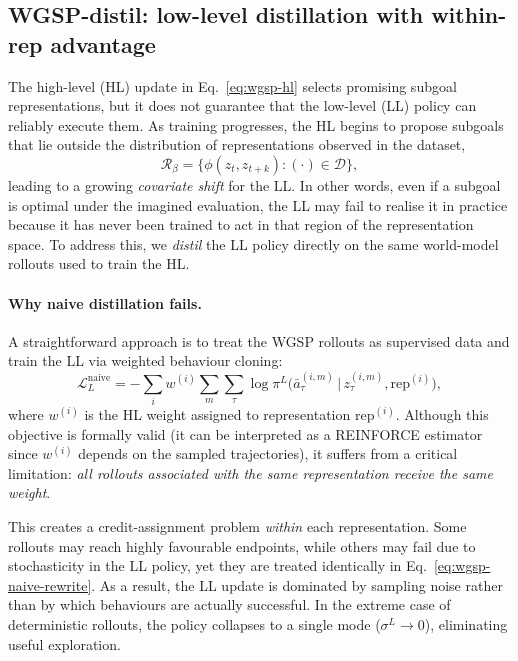 \subsection{WGSP-distil: low-level distillation with within-rep advantage}
\label{sec:wgsp:distil}

The high-level (HL) update in Eq.~\eqref{eq:wgsp-hl} selects promising
subgoal representations, but it does not guarantee that the low-level
(LL) policy can reliably execute them. As training progresses, the HL
begins to propose subgoals that lie outside the distribution of
representations observed in the dataset,
\[
\mathcal R_\beta=\{\phi(z_t,z_{t+k}) : (\cdot)\in\mathcal D\},
\]
leading to a growing \emph{covariate shift} for the LL. In other words,
even if a subgoal is optimal under the imagined evaluation, the LL may
fail to realise it in practice because it has never been trained to act
in that region of the representation space. To address this, we
\emph{distil} the LL policy directly on the same world-model rollouts
used to train the HL.

\paragraph{Why naive distillation fails.}
A straightforward approach is to treat the WGSP rollouts as supervised
data and train the LL via weighted behaviour cloning:
\begin{equation}
\mathcal{L}_L^\text{naive}
= -\sum_i w^{(i)}\sum_m\sum_\tau
\log\pi^L\!\big(\bar a_\tau^{(i,m)}\,\big|\,z_\tau^{(i,m)},\text{rep}^{(i)}\big),
\label{eq:wgsp-naive-rewrite}
\end{equation}
where $w^{(i)}$ is the HL weight assigned to representation
$\text{rep}^{(i)}$. Although this objective is formally valid (it can
be interpreted as a REINFORCE estimator since $w^{(i)}$ depends on the
sampled trajectories), it suffers from a critical limitation:
\emph{all rollouts associated with the same representation receive the
same weight}. 

This creates a credit-assignment problem \emph{within} each
representation. Some rollouts may reach highly favourable endpoints,
while others may fail due to stochasticity in the LL policy, yet they
are treated identically in Eq.~\eqref{eq:wgsp-naive-rewrite}. As a
result, the LL update is dominated by sampling noise rather than by
which behaviours are actually successful. In the extreme case of
deterministic rollouts, the policy collapses to a single mode
($\sigma^L \to 0$), eliminating useful exploration.

